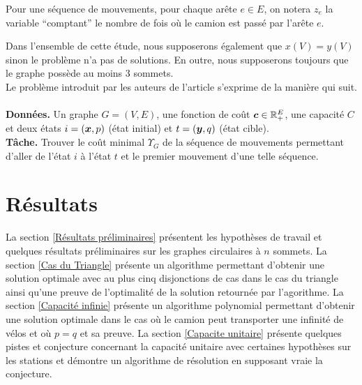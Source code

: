 Pour une séquence de mouvements, pour chaque arête $e \in E$, on notera $z_e$ la variable ``comptant'' le nombre de fois où le camion est passé par l'arête $e$.

Dans l'ensemble de cette étude, nous supposerons également que $x(V) = y(V)$ sinon le problème n'a pas de solutions. En outre, nous supposerons toujours que le graphe possède au moins 3 sommets.
\\

Le problème introduit par les auteurs de l'article \cite{Benchimol2011} s'exprime de la manière qui suit.
\\
\\
\textbf{Données.} Un graphe $G=(V,E)$, une fonction de coût $\boldsymbol{c} \in \mathbb{R}^E_+$, une capacité $C$ et deux états $i=(\boldsymbol{x},p)$ (état initial) et $t=(\boldsymbol{y},q)$ (état cible).
\\
\textbf{Tâche.} Trouver le coût minimal $\Upsilon_{G}$ de la séquence de mouvements permettant d'aller de l'état $i$ à l'état $t$ et le premier mouvement d'une telle séquence.

\section{Résultats}

La section \ref{Résultats préliminaires} présentent les hypothèses de travail et quelques résultats préliminaires sur les graphes circulaires à $n$ sommets. La section \ref{Cas du Triangle} présente un algorithme permettant d'obtenir une solution optimale avec au plus cinq disjonctions de cas dans le cas du triangle ainsi qu'une preuve de l'optimalité de la solution retournée par l'agorithme. La section \ref{Capacité infinie} présente un algorithme polynomial permettant d'obtenir une solution optimale dans le cas où le camion peut transporter une infinité de vélos et où $p=q$ et sa preuve. La section \ref{Capacite unitaire} présente quelques pistes et conjecture concernant la capacité unitaire avec certaines hypothèses sur les stations et démontre un algorithme de résolution en supposant vraie la conjecture.